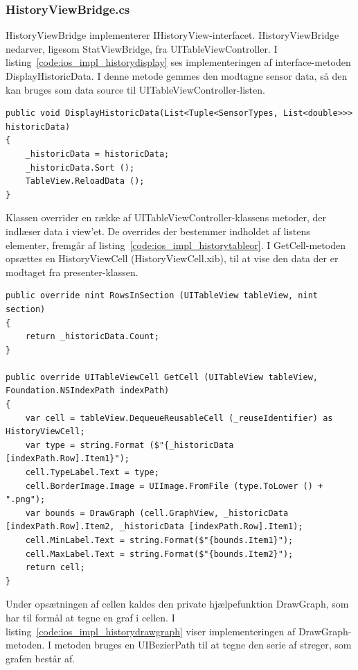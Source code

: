 \subsubsection{HistoryViewBridge.cs}
HistoryViewBridge implementerer IHistoryView-interfacet. HistoryViewBridge nedarver, ligesom StatViewBridge, fra UITableViewController. I listing~\ref{code:ios_impl_historydisplay} ses implementeringen af interface-metoden DisplayHistoricData. I denne metode gemmes den modtagne sensor data, så den kan bruges som data source til UITableViewController-listen.

\begin{lstlisting}[caption={DisplayHistoricData(...)},label={code:ios_impl_historydisplay}]
public void DisplayHistoricData(List<Tuple<SensorTypes, List<double>>> historicData)
{
	_historicData = historicData;
	_historicData.Sort ();
	TableView.ReloadData ();
}
\end{lstlisting}

Klassen overrider en række af UITableViewController-klassens metoder, der indlæser data i view'et. De overrides der bestemmer indholdet af listens elementer, fremgår af listing~\ref{code:ios_impl_historytableor}. I GetCell-metoden opsættes en HistoryViewCell (HistoryViewCell.xib), til at vise den data der er modtaget fra presenter-klassen.

\begin{lstlisting}[caption={Overrides af UITableViewController-metoder i HistoryViewBridge},label={code:ios_impl_historytableor}]
public override nint RowsInSection (UITableView tableView, nint section)
{
	return _historicData.Count;
}

public override UITableViewCell GetCell (UITableView tableView, Foundation.NSIndexPath indexPath)
{
	var cell = tableView.DequeueReusableCell (_reuseIdentifier) as HistoryViewCell;
	var type = string.Format ($"{_historicData [indexPath.Row].Item1}");
	cell.TypeLabel.Text = type;
	cell.BorderImage.Image = UIImage.FromFile (type.ToLower () + ".png");
	var bounds = DrawGraph (cell.GraphView, _historicData [indexPath.Row].Item2, _historicData [indexPath.Row].Item1);
	cell.MinLabel.Text = string.Format($"{bounds.Item1}");
	cell.MaxLabel.Text = string.Format($"{bounds.Item2}");
	return cell;
}
\end{lstlisting}

Under opsætningen af cellen kaldes den private hjælpefunktion DrawGraph, som har til formål at tegne en graf i cellen. I listing~\ref{code:ios_impl_historydrawgraph} viser implementeringen af DrawGraph-metoden. I metoden bruges en UIBezierPath til at tegne den serie af streger, som grafen består af.

